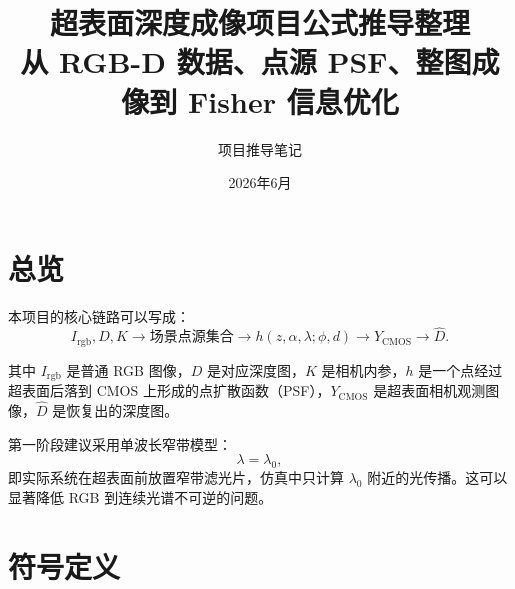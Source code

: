 \documentclass[11pt,a4paper,fontset=none]{ctexart}
\title{\bfseries 超表面深度成像项目公式推导整理\\
\large 从 RGB-D 数据、点源 PSF、整图成像到 Fisher 信息优化}
\author{项目推导笔记}
\date{2026年6月}
\begin{document}
\maketitle
\tableofcontents
\newpage

\section{总览}

本项目的核心链路可以写成：
\begin{equation}
  I_{\mathrm{rgb}},D,K
  \longrightarrow
  \text{场景点源集合}
  \longrightarrow
  h(z,\alpha,\lambda;\phi,d)
  \longrightarrow
  Y_{\mathrm{CMOS}}
  \longrightarrow
  \hat D .
\end{equation}

其中 $I_{\mathrm{rgb}}$ 是普通 RGB 图像，$D$ 是对应深度图，$K$ 是相机内参，$h$ 是一个点经过超表面后落到 CMOS 上形成的点扩散函数（PSF），$Y_{\mathrm{CMOS}}$ 是超表面相机观测图像，$\hat D$ 是恢复出的深度图。

第一阶段建议采用单波长窄带模型：
\begin{equation}
  \lambda=\lambda_0,
\end{equation}
即实际系统在超表面前放置窄带滤光片，仿真中只计算 $\lambda_0$ 附近的光传播。这可以显著降低 RGB 到连续光谱不可逆的问题。

\section{符号定义}
\end{document}
